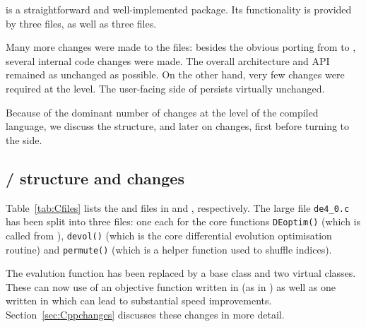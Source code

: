 \documentclass[nojss,shortnames,article]{jss}
\begin{document}
 is a straightforward and well-implemented package. Its
functionality is provided by three  files, as well as three
 files.

Many more changes were made to the  files: besides the obvious
porting from  to , several internal code changes
were made.  The overall architecture and API remained as unchanged as
possible.  
%
On the other hand, very few changes were required at the 
level. The user-facing side of  persists virtually unchanged.  

Because of the dominant number of changes at the level of the compiled
language, we discuss the structure, and later on changes, first before
turning to the  side.

\subsection[C / C++ structure and changes]{\proglang{} /  structure and changes}

Table~\ref{tab:Cfiles} lists the  and 
files in  and , respectively. 
The large file \verb|de4_0.c| has been split into three files: one each for
the core functions \verb|DEoptim()| (which is called from ),
\verb|devol()| (which is the core differential evolution optimisation
routine) and \verb|permute()| (which is a helper function used to shuffle
indices).  

The evalution function has been replaced by a base class and two virtual
classes. These can now use of an objective function written in 
(as in ) as well as one written in  which can lead
to substantial speed improvements.  Section~\ref{sec:Cppchanges} discusses
these changes in more detail.
\end{document}
